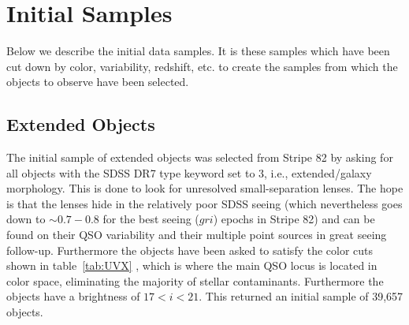 \documentclass[a4paper,11pt]{article}
\begin{document}
\section{Initial Samples}

Below we describe the initial data samples. It is these samples which have been cut down by color, variability, redshift, etc. to create the samples from which the objects to observe have been selected.

\subsection{Extended Objects}

The initial sample of extended objects was selected from Stripe 82 by asking for all objects with the SDSS DR7 type keyword set to 3, i.e., extended/galaxy morphology. This is done to look for unresolved small-separation lenses. The hope is that the lenses hide in the relatively poor SDSS seeing (which nevertheless goes down to $\sim0.7-0.8$ for the best seeing ($gri$) epochs in Stripe 82) and can be found on their QSO variability and their multiple point sources in great seeing follow-up. Furthermore the objects have been asked to satisfy the color cuts shown in table~\ref{tab:UVX} \citep[table~1 in ][]{schmidt10}, which is where the main QSO locus is located in color space, eliminating the majority of stellar contaminants. Furthermore the objects have a brightness of $17<i< 21$. This returned an initial sample of 39,657 objects.

\begin{table}[!h]
\end{table}
\end{document}
